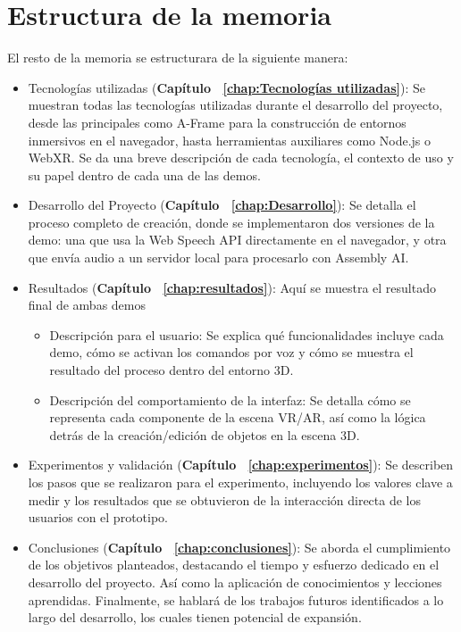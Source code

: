 \documentclass[a4paper, 12pt]{book}
\begin{document}
\section{Estructura de la memoria}
\label{sec:estructura}
  
El resto de la memoria se estructurara de la siguiente manera:

\begin{itemize}
    \setlength\itemsep{0.3em}  %
    \item Tecnologías utilizadas (\textbf{Capítulo ~\ref{chap:Tecnologías utilizadas}}): Se muestran todas las tecnologías utilizadas durante el desarrollo del proyecto, desde las principales como A-Frame para la construcción de entornos inmersivos en el navegador, hasta herramientas auxiliares como Node.js o WebXR. Se da una breve descripción de cada tecnología, el contexto de uso y su papel dentro de cada una de las demos.
  
    \item Desarrollo del Proyecto (\textbf{Capítulo ~\ref{chap:Desarrollo}}): Se detalla el proceso completo de creación, donde se implementaron dos versiones de la demo: una que usa la Web Speech API directamente en el navegador, y otra que envía audio a un servidor local para procesarlo con Assembly AI.
  
    \item Resultados (\textbf{Capítulo ~\ref{chap:resultados}}):
 Aquí se muestra el resultado final de ambas demos
\begin{itemize}
  \item Descripción para el usuario: 
  Se explica qué funcionalidades incluye cada demo, cómo se activan los comandos por voz y cómo se muestra el resultado del proceso dentro del entorno 3D. 
  \item Descripción del comportamiento de la interfaz: 
  Se detalla cómo se representa cada componente de la escena VR/AR, así como la lógica detrás de la creación/edición de objetos en la escena 3D.
\end{itemize}
    \item Experimentos y validación (\textbf{Capítulo ~\ref{chap:experimentos}}):
    Se describen los pasos que se realizaron para el experimento, incluyendo los valores clave a medir y los resultados que se obtuvieron de la interacción directa de los usuarios con el prototipo.
    \item Conclusiones (\textbf{Capítulo ~\ref{chap:conclusiones}}):
    Se aborda el cumplimiento de los objetivos planteados, destacando el tiempo y esfuerzo dedicado en el desarrollo del proyecto. Así como la aplicación de conocimientos y lecciones aprendidas. Finalmente, se hablará de los trabajos futuros  identificados  a lo largo del desarrollo, los cuales tienen potencial de expansión.
\end{itemize}
\end{document}
